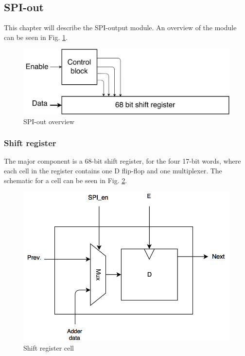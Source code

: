 
 \newpage
\subsection{SPI-out}
This chapter will describe the SPI-output module. An overview of the module can be seen in Fig. \ref{spi_out}.

\begin{figure}[H]
\centering
\captionsetup{justification=centering}
\includegraphics[scale=0.15]{../figures/spi_out.png}
\caption{SPI-out overview}
\label{spi_out}
\end{figure}

\subsubsection{Shift register}
The major component is a 68-bit shift register, for the four 17-bit words, where each cell in the register contains one D flip-flop and one multiplexer. The schematic for a cell can be seen in Fig. \ref{mux_dff}.

\begin{figure}[H]
\centering
\captionsetup{justification=centering}
\includegraphics[scale=0.35]{../figures/MUX_DFF.png}
\caption{Shift register cell}
\label{mux_dff}
\end{figure}

